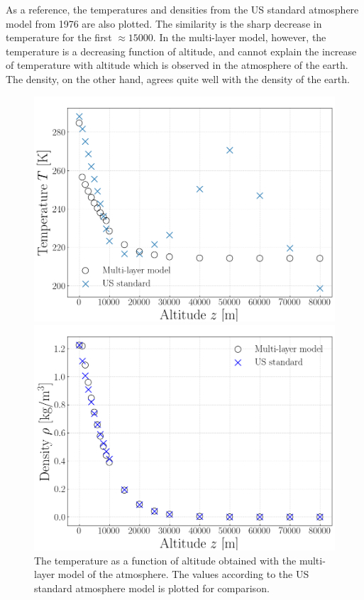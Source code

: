 \documentclass[twocolumn]{article}
\begin{document}
\begin{large}
As a reference, the temperatures and densities from the US standard atmosphere model from 1976 are also plotted. The similarity is the sharp decrease in temperature for the first $\approx 15000$. In the multi-layer model, however, the temperature is a decreasing function of altitude, and cannot explain the increase of temperature with altitude which is observed in the atmosphere of the earth. The density, on the other hand, agrees quite well with the density of the earth. 
\begin{figure}[!t]
    \begin{center}
        \includegraphics[scale=0.35]{Temperature.png}
    \end{center}
    \caption{The temperature as a function of altitude obtained with the multi-layer model of the atmosphere. The values according to the US standard atmosphere model is plotted for comparison.}
    \label{9maj2055}
    \begin{center}
        \includegraphics[scale=0.35]{Density.png}

\end{center}
\end{figure}
\end{large}
\end{document}
